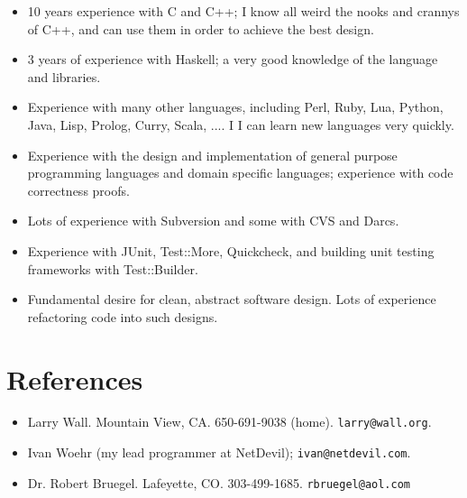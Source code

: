 \documentclass[12pt]{article}
\begin{document}
\begin{itemize}
\item 10 years experience with C and C++; I know all weird the nooks and
crannys of C++, and can use them in order to achieve the best design.
\item 3 years of experience with Haskell; a very good knowledge of the
language and libraries.  
\item Experience with many other languages, including Perl,
Ruby, Lua, Python, Java, Lisp, Prolog, Curry, Scala, ....  I
I can learn new languages very quickly.
\item Experience with the design and implementation of general purpose
programming languages and domain specific languages; experience with
code correctness proofs.
\item Lots of experience with Subversion and some with CVS and Darcs.
\item Experience with JUnit, Test::More, Quickcheck, and building
unit testing frameworks with Test::Builder.
\item Fundamental desire for clean, abstract software design.  Lots of
experience refactoring code into such designs.
\end{itemize}

\section*{References}

\begin{itemize}
\item Larry Wall. Mountain View, CA.  650-691-9038 (home).
\verb|larry@wall.org|.
\item Ivan Woehr (my lead programmer at NetDevil);
\texttt{ivan@netdevil.com}.
\item Dr. Robert Bruegel.  Lafeyette, CO.  303-499-1685.
\verb|rbruegel@aol.com|
\end{itemize}
\end{document}
